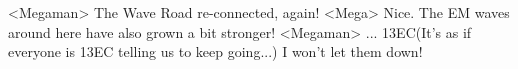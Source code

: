 <Megaman> The Wave Road re-connected, again! 
<Mega> Nice. 
The EM waves around here have also grown a bit stronger! 
<Megaman> ... 
{13}{EC}(It's as if everyone is {13}{EC} telling us to keep going...) 
I won't let them down! 

